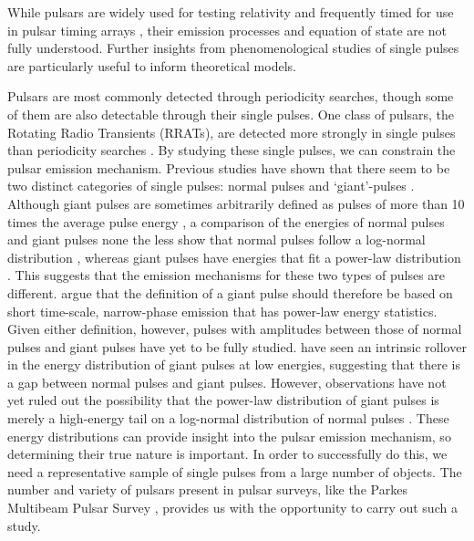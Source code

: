\documentclass[fleqn,usenatbib]{mnras}
\begin{document}
While pulsars are widely used for testing relativity \citep[e.g.,][]{Taylor:1982, Kramer:2006, Antoniadis:2013} and frequently timed for use in pulsar timing arrays \citep[e.g.,][]{Jenet:2009, Ferdman:2010, Hobbs:2010, Manchester:2013}, their emission processes \citep[see, e.g.,][]{Weatherall:1998, Istomin:2004, Petrova:2006} and equation of state \citep[e.g.,][]{Demorest:2010, Katayama:2012} are not fully understood. Further insights from phenomenological studies of single pulses are particularly useful to inform theoretical models.

Pulsars are most commonly detected through periodicity searches, though some of them are also detectable through their single pulses. One class of pulsars, the Rotating Radio Transients (RRATs), are detected more strongly in single pulses than periodicity searches \citep{Keane:2011}. By studying these single pulses, we can constrain the pulsar emission mechanism. Previous studies have shown that there seem to be two distinct categories of single pulses: normal pulses and `giant'-pulses \citep[see, e.g.,][]{Lundgren:1995, Johnston:2002, Kramer:2002}. Although giant pulses are sometimes arbitrarily defined as pulses of more than 10 times the average pulse energy \citep[e.g.,][]{Karuppusamy:2010, Karuppusamy:2012}, a comparison of the energies of normal pulses and giant pulses none the less show that normal pulses follow a log-normal distribution \citep{Cognard:1996, Cairns:2001, Cairns:2004}, whereas giant pulses have energies that fit a power-law distribution \citep{Lundgren:1995, Johnston:2002, Kramer:2002}. This suggests that the emission mechanisms for these two types of pulses are different. \citet{Knight:2006} argue that the definition of a giant pulse should therefore be based on short time-scale, narrow-phase emission that has power-law energy statistics. Given either definition, however, pulses with amplitudes between those of normal pulses and giant pulses have yet to be fully studied. \citet{Lundgren:1995} have seen an intrinsic rollover in the energy distribution of giant pulses at low energies, suggesting that there is a gap between normal pulses and giant pulses. However, observations have not yet ruled out the possibility that the power-law distribution of giant pulses is merely a high-energy tail on a log-normal distribution of normal pulses \citep{Karuppusamy:2011}. These energy distributions can provide insight into the pulsar emission mechanism, so determining their true nature is important. In order to successfully do this, we need a representative sample of single pulses from a large number of objects. The number and variety of pulsars present in pulsar surveys, like the Parkes Multibeam Pulsar Survey \citep[hereafter PMPS;][]{Manchester:2001}, provides us with the opportunity to carry out such a study.
\end{document}
